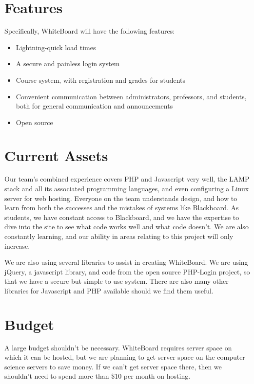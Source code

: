 \documentclass{article}
\begin{document}
\section{Features}

Specifically, WhiteBoard will have the following features:
\begin{itemize}
    \item Lightning-quick load times
    \item A secure and painless login system
    \item Course system, with registration and grades for students
    \item Convenient communication between administrators, professors, and
        students, both for general communication and announcements
    \item Open source
\end{itemize}

\section{Current Assets}

Our team's combined experience covers PHP and Javascript very well, the LAMP
stack and all its associated programming languages, and even configuring a
Linux server for web hosting. Everyone on the team understands design, and how
to learn from both the successes and the mistakes of systems like Blackboard.
As students, we have constant access to Blackboard, and we have the expertise
to dive into the site to see what code works well and what code doesn't. We are
also constantly learning, and our ability in areas relating to this project
will only increase.

We are also using several libraries to assist in creating WhiteBoard. We are
using jQuery, a javascript library, and code from the open source PHP-Login
project, so that we have a secure but simple to use system. There are also many
other libraries for Javascript and PHP available should we find them useful.

\section{Budget}

A large budget shouldn't be necessary. WhiteBoard requires server space on
which it can be hosted, but we are planning to get server space on the computer
science servers to save money. If we can't get server space there, then we
shouldn't need to spend more than \$10 per month on hosting.
\end{document}
